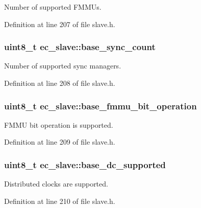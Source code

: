 \-Number of supported \-F\-M\-M\-Us. 



\-Definition at line 207 of file slave.\-h.

\subsubsection[{base\-\_\-sync\-\_\-count}]{\setlength{\rightskip}{0pt plus 5cm}uint8\-\_\-t {\bf ec\-\_\-slave\-::base\-\_\-sync\-\_\-count}}\label{structec__slave_aa4d67d55717398c4f25d379ede390d5d}


\-Number of supported sync managers. 



\-Definition at line 208 of file slave.\-h.

\subsubsection[{base\-\_\-fmmu\-\_\-bit\-\_\-operation}]{\setlength{\rightskip}{0pt plus 5cm}uint8\-\_\-t {\bf ec\-\_\-slave\-::base\-\_\-fmmu\-\_\-bit\-\_\-operation}}\label{structec__slave_a39d39fe2e87602de4629cfbdb0106929}


\-F\-M\-M\-U bit operation is supported. 



\-Definition at line 209 of file slave.\-h.

\subsubsection[{base\-\_\-dc\-\_\-supported}]{\setlength{\rightskip}{0pt plus 5cm}uint8\-\_\-t {\bf ec\-\_\-slave\-::base\-\_\-dc\-\_\-supported}}\label{structec__slave_a2b02f5e40a79f9b6213dde898a10b873}


\-Distributed clocks are supported. 



\-Definition at line 210 of file slave.\-h.

